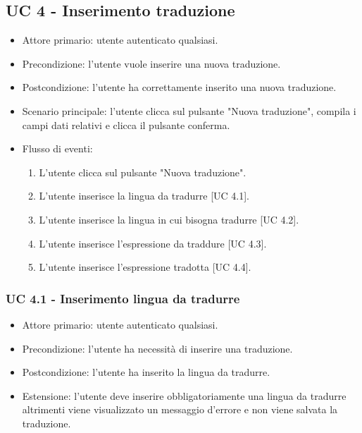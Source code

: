 \subsection*{UC 4 - Inserimento traduzione}
    \begin{itemize}
    \item Attore primario: utente autenticato qualsiasi.
    \item Precondizione: l'utente vuole inserire una nuova traduzione.
    \item Postcondizione: l'utente ha correttamente inserito una nuova traduzione.
    \item Scenario principale: l'utente clicca sul pulsante "Nuova traduzione", compila i campi dati relativi e clicca il pulsante conferma.
    \item Flusso di eventi:
        \begin{enumerate}
            \item L'utente clicca sul pulsante "Nuova traduzione".
            \item L'utente inserisce la lingua da tradurre [UC 4.1].
            \item L'utente inserisce la lingua in cui bisogna tradurre [UC 4.2].
            \item L'utente inserisce l'espressione da traddure [UC 4.3].
            \item L'utente inserisce l'espressione tradotta [UC 4.4].
        \end{enumerate}
    \end{itemize}
    \subsubsection*{UC 4.1 - Inserimento lingua da tradurre}
        \begin{itemize}
            \item Attore primario: utente autenticato qualsiasi.
            \item Precondizione: l'utente ha necessità di inserire una traduzione.
            \item Postcondizione: l'utente ha inserito la lingua da tradurre.
            \item Estensione: l'utente deve inserire obbligatoriamente una lingua da tradurre altrimenti viene visualizzato un messaggio d'errore e non viene salvata la traduzione.
        \end{itemize}
